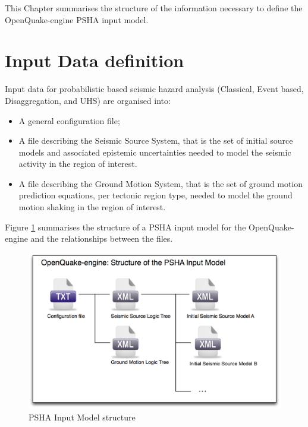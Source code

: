 This Chapter summarises the structure of the information necessary 
to define the OpenQuake-engine PSHA input model. 
\section{Input Data definition}
\label{sec:hazInputData}
Input data for probabilistic based seismic hazard analysis (Classical, 
Event based, Disaggregation, and UHS) are organised into:
\begin{itemize}
\item A general configuration file;
\item A file describing the Seismic Source System, that is the set of 
    initial source models and associated epistemic uncertainties needed 
    to model the seismic activity in the region of interest.
\item A file describing the Ground Motion System, that is the set of ground 
    motion prediction equations, per tectonic region type, needed to model 
    the ground motion shaking in the region of interest.
\end{itemize}
%
Figure \ref{fig:psha_input} summarises the structure of a PSHA input model
for the OpenQuake-engine and the relationships between the files.
\begin{figure}[!ht]
\centering
\includegraphics[width=14cm]{./figures/hazard/psha_input_structure.eps}
\caption{PSHA Input Model structure}
\label{fig:psha_input}
\end{figure}
